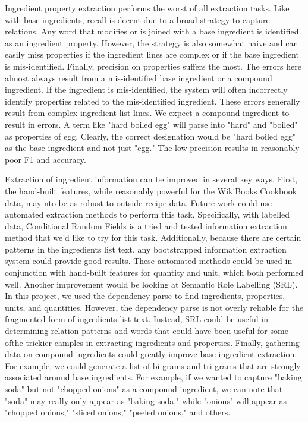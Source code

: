 \documentclass[11pt]{article}
\begin{document}
Ingredient property extraction performs the worst of all extraction tasks. Like with base ingredients, recall is decent due to a broad strategy to capture relations. Any word that modifies or is joined with a base ingredient is identified as an ingredient property. However, the strategy is also somewhat naive and can easily miss properties if the ingredient lines are complex or if the base ingredient is mis-identified. Finally, precision on properties suffers the most. The errors here almost always result from a mis-identified base ingredient or a compound ingredient. If the ingredient is mis-identified, the system will often incorrectly identify properties related to the mis-identified ingredient. These errors generally result from complex ingredient list lines. We expect a compound ingredient to result in errors. A term like "hard boiled egg" will parse into "hard" and "boiled" as properties of egg. Clearly, the correct designation would be "hard boiled egg" as the base ingredient and not just "egg." The low precision results in reasonably poor F1 and accuracy. 

Extraction of ingredient information can be improved in several key ways. First, the hand-built features, while reasonably powerful for the WikiBooks Cookbook data, may nto be as robust to outside recipe data. Future work could use automated extraction methods to perform this task. Specifically, with labelled data, Conditional Random Fields is a tried and tested information extraction method that we'd like to try for this task. Additionally, because there are certain patterns in the ingredients list text, any bootstrapped information extraction system could provide good results. These automated methods could be used in conjunction with hand-built features for quantity and unit, which both performed well. Another improvement would be looking at Semantic Role Labelling (SRL). In this project, we used the dependency parse to find ingredients, properties, units, and quantities. However, the dependency parse is not overly reliable for the fragmented form of ingredients list text. Instead, SRL could be useful in determining relation patterns and words that could have been useful for some ofthe trickier eamples in extracting ingredients and properties. Finally, gathering data on compound ingredients could greatly improve base ingredient extraction. For example, we could generate a list of  bi-grams and tri-grams that are strongly associated around base ingredients. For example, if we wanted to capture "baking soda" but not "chopped onions" as a compound ingredient, we can note that "soda" may really only appear as "baking soda," while "onions" will appear as "chopped onions," "sliced onions," "peeled onions," and others.
\end{document}
